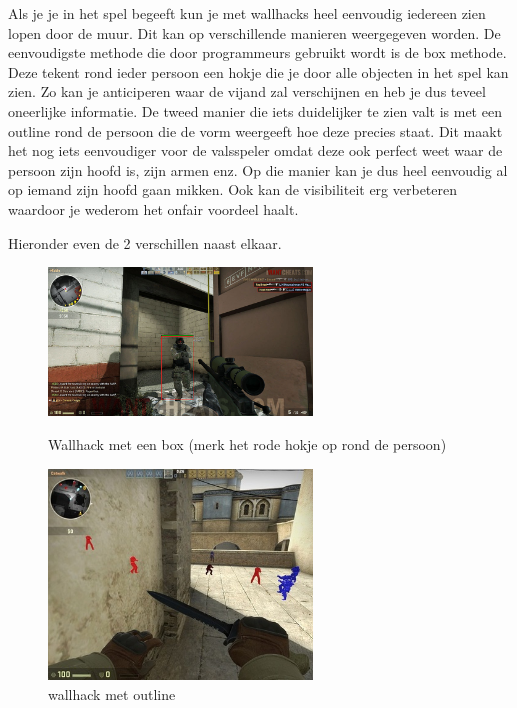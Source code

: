 \documentclass[pdftex,a4paper,12pt,twoside]{report}
\begin{document}
Als je je in het spel begeeft kun je met wallhacks heel eenvoudig iedereen zien lopen door de muur. Dit kan op verschillende manieren weergegeven worden. De eenvoudigste methode die door programmeurs gebruikt wordt is de box methode. Deze tekent rond ieder persoon een hokje die je door alle objecten in het spel kan zien. Zo kan je anticiperen waar de vijand zal verschijnen en heb je dus teveel oneerlijke informatie. 
De tweed manier die iets duidelijker te zien valt is met een outline rond de persoon die de vorm weergeeft hoe deze precies staat. Dit maakt het nog iets eenvoudiger voor de valsspeler omdat deze ook perfect weet waar de persoon zijn hoofd is, zijn armen enz. Op die manier kan je dus heel eenvoudig al op iemand zijn hoofd gaan mikken. Ook kan de visibiliteit erg verbeteren waardoor je wederom het onfair voordeel haalt.

Hieronder even de 2 verschillen naast elkaar.


\begin{figure}[H]
\centering
\begin{minipage}{0.48\textwidth}
\centering
\includegraphics[width=7cm]{img/wallhack-example-box}
\caption{Wallhack met een box (merk het rode hokje op rond de persoon)}
\end{minipage}\hfill
\begin{minipage}{0.48\textwidth}
\centering
\includegraphics[width=7cm]{img/wallhack-example-outline}
\caption{wallhack met outline}
\end{minipage}
\end{figure}  
\end{document}
